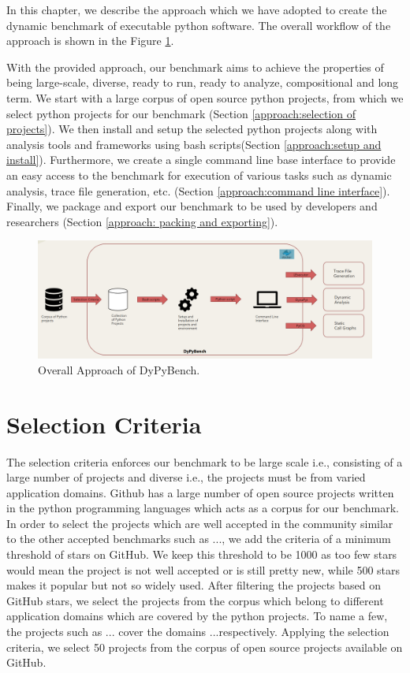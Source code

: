 In this chapter, we describe the approach which we have adopted to create the dynamic benchmark of executable python software. The overall workflow of the approach is shown in the Figure \ref{fig:overall_approach}.

With the provided approach, our benchmark aims to achieve the properties of being large-scale, diverse, ready to run, ready to analyze, compositional and long term. We start with a large corpus of open source python projects, from which we select python projects for our benchmark (Section \ref{approach:selection of projects}). We then install and setup the selected python projects along with analysis tools and frameworks using bash scripts(Section \ref{approach:setup and install}). Furthermore, we create a single command line base interface to provide an easy access to the benchmark for execution of various tasks such as dynamic analysis, trace file generation, etc. (Section \ref{approach:command line interface}). Finally, we package and export our benchmark to be used by developers and researchers (Section \ref{approach: packing and exporting}). 

\begin{figure}[ht]
\centering
\includegraphics[width=1\linewidth]{figures/approach/Approach_final.png}
\caption[Approach]{\label{fig:overall_approach}Overall Approach of DyPyBench.}
\end{figure}

\section{Selection Criteria}
\label{approach:selection criteria}
The selection criteria enforces our benchmark to be large scale i.e., consisting of a large number of projects and diverse i.e., the projects must be from varied application domains. Github \cite{github} has a large number of open source projects written in the python programming languages which acts as a corpus for our benchmark. In order to select the projects which are well accepted in the community similar to the other accepted benchmarks such as ..., we add the criteria of a minimum threshold of stars on GitHub. We keep this threshold to be 1000 as too few stars would mean the project is not well accepted or is still pretty new, while 500 stars makes it popular but not so widely used. After filtering the projects based on GitHub stars, we select the projects from the corpus which belong to different application domains which are covered by the python projects. To name a few, the projects such as ... cover the domains ...respectively. Applying the selection criteria, we select 50 projects from the corpus of open source projects available on GitHub.

